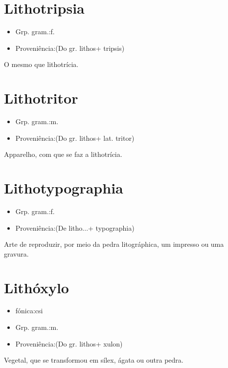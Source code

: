 \section{Lithotripsia}
\begin{itemize}
\item {Grp. gram.:f.}
\end{itemize}
\begin{itemize}
\item {Proveniência:(Do gr. \textunderscore lithos\textunderscore  + \textunderscore tripsis\textunderscore )}
\end{itemize}
O mesmo que \textunderscore lithotrícia\textunderscore .
\section{Lithotritor}
\begin{itemize}
\item {Grp. gram.:m.}
\end{itemize}
\begin{itemize}
\item {Proveniência:(Do gr. \textunderscore lithos\textunderscore  + lat. \textunderscore tritor\textunderscore )}
\end{itemize}
Apparelho, com que se faz a lithotrícia.
\section{Lithotypographia}
\begin{itemize}
\item {Grp. gram.:f.}
\end{itemize}
\begin{itemize}
\item {Proveniência:(De \textunderscore litho...\textunderscore  + \textunderscore typographia\textunderscore )}
\end{itemize}
Arte de reproduzir, por meio da pedra litográphica, um impresso ou uma gravura.
\section{Lithóxylo}
\begin{itemize}
\item {fónica:csi}
\end{itemize}
\begin{itemize}
\item {Grp. gram.:m.}
\end{itemize}
\begin{itemize}
\item {Proveniência:(Do gr. \textunderscore lithos\textunderscore  + \textunderscore xulon\textunderscore )}
\end{itemize}
Vegetal, que se transformou em sílex, ágata ou outra pedra.
